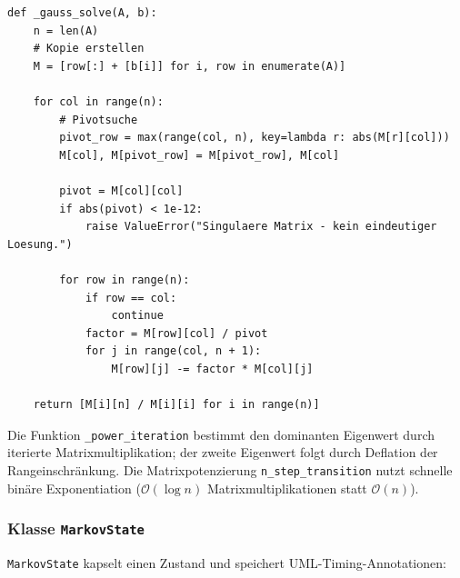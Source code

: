 ﻿\documentclass[a4paper,12pt]{scrreprt}
\theoremstyle{definition}
\begin{document}
\begin{lstlisting}[style=python, caption={Gauß-Elimination mit Spaltenpivotisierung (Kernfunktion)}, label=lst:gauss]
def _gauss_solve(A, b):
    n = len(A)
    # Kopie erstellen
    M = [row[:] + [b[i]] for i, row in enumerate(A)]

    for col in range(n):
        # Pivotsuche
        pivot_row = max(range(col, n), key=lambda r: abs(M[r][col]))
        M[col], M[pivot_row] = M[pivot_row], M[col]

        pivot = M[col][col]
        if abs(pivot) < 1e-12:
            raise ValueError("Singulaere Matrix - kein eindeutiger Loesung.")

        for row in range(n):
            if row == col:
                continue
            factor = M[row][col] / pivot
            for j in range(col, n + 1):
                M[row][j] -= factor * M[col][j]

    return [M[i][n] / M[i][i] for i in range(n)]
\end{lstlisting}

Die Funktion \texttt{\_power\_iteration} bestimmt den dominanten Eigenwert
durch iterierte Matrixmultiplikation; der zweite Eigenwert folgt durch
Deflation der Rangeinschränkung. Die Matrixpotenzierung
\texttt{n\_step\_transition} nutzt schnelle binäre Exponentiation
($\mathcal{O}(\log n)$ Matrixmultiplikationen statt $\mathcal{O}(n)$).

\subsubsection{Klasse \texttt{MarkovState}}

\texttt{MarkovState} kapselt einen Zustand und speichert UML-Timing-Annotationen:
\end{document}
